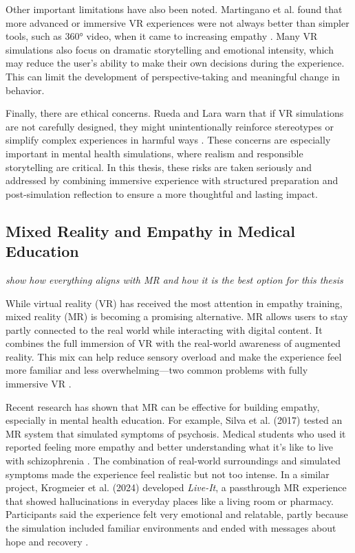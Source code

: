 Other important limitations have also been noted. Martingano et al. found that more advanced or immersive VR experiences were not always better than simpler tools, such as 360° video, when it came to increasing empathy \cite{Martingano2021}. Many VR simulations also focus on dramatic storytelling and emotional intensity, which may reduce the user’s ability to make their own decisions during the experience. This can limit the development of perspective-taking and meaningful change in behavior.

Finally, there are ethical concerns. Rueda and Lara warn that if VR simulations are not carefully designed, they might unintentionally reinforce stereotypes or simplify complex experiences in harmful ways \cite{Rueda2020}. These concerns are especially important in mental health simulations, where realism and responsible storytelling are critical. In this thesis, these risks are taken seriously and addressed by combining immersive experience with structured preparation and post-simulation reflection to ensure a more thoughtful and lasting impact.

\subsection{Mixed Reality and Empathy in Medical Education}
\emph{show how everything aligns with MR and how it is the best option for this thesis}

While virtual reality (VR) has received the most attention in empathy training, mixed reality (MR) is becoming a promising alternative. MR allows users to stay partly connected to the real world while interacting with digital content. It combines the full immersion of VR with the real-world awareness of augmented reality. This mix can help reduce sensory overload and make the experience feel more familiar and less overwhelming—two common problems with fully immersive VR \cite{Zare-Bidaki2022}.

Recent research has shown that MR can be effective for building empathy, especially in mental health education. For example, Silva et al. (2017) tested an MR system that simulated symptoms of psychosis. Medical students who used it reported feeling more empathy and better understanding what it’s like to live with schizophrenia \cite{Silva2017}. The combination of real-world surroundings and simulated symptoms made the experience feel realistic but not too intense. In a similar project, Krogmeier et al. (2024) developed \textit{Live-It}, a passthrough MR experience that showed hallucinations in everyday places like a living room or pharmacy. Participants said the experience felt very emotional and relatable, partly because the simulation included familiar environments and ended with messages about hope and recovery \cite{Krogmeier2024}.


